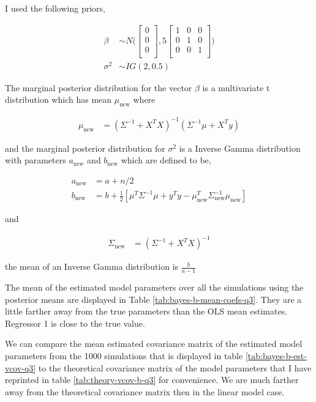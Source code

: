 \documentclass[]{book}
\begin{document}
I used the following priors,

\begin{align}
  \beta &\sim N \bigg( 
  \begin{bmatrix}
  0\\
  0\\
  0\\
  \end{bmatrix},
  5 \begin{bmatrix}
  1 & 0 & 0\\
  0 & 1 & 0\\
  0 & 0 & 1\\
  \end{bmatrix} \bigg)\\
  \sigma^2 &\sim IG(2, 0.5)
\end{align}

The marginal posterior distribution for the vector \(\beta\) is a multivariate t distribution which has mean \(\mu_\text{new}\) where

\begin{align}
  \mu_\text{new} &= (\Sigma^{-1} + X^T X)^{-1} (\Sigma^{-1} \mu + X^T y)
\end{align}

and the marginal posterior distribution for \(\sigma^2\) is a Inverse Gamma distribution with parameters \(a_\text{new}\) and \(b_\text{new}\) which are defined to be,

\begin{align}
  a_\text{new} &= a + n/2\\
  b_\text{new} &= b + \frac{1}{2}[\mu^T \Sigma^{-1} \mu + y^T y - \mu_\text{new}^T \Sigma_\text{new}^{-1} \mu_\text{new}]
\end{align}

and

\begin{align*}
  \Sigma_\text{new} &= (\Sigma^{-1} + X^T X)^{-1}
\end{align*}

the mean of an Inverse Gamma distribution is \(\frac{b}{a - 1}\)

The mean of the estimated model parameters over all the simulations using the posterior means are displayed in Table \ref{tab:bayes-b-mean-coefs-q3}. They are a little farther away from the true parameters than the OLS mean estimates. Regressor 1 is close to the true value.

We can compare the mean estimated covariance matrix of the estimated model parameters from the 1000 simulations that is displayed in table \ref{tab:bayes-b-est-vcov-q3} to the theoretical covariance matrix of the model parameters that I have reprinted in table \ref{tab:theory-vcov-b-q3} for convenience. We are much farther away from the theoretical covariance matrix then in the linear model case.
\end{document}
